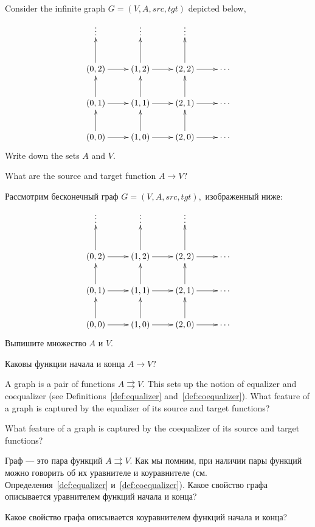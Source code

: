 \documentclass[../main/CT4S-EN-RU]{subfiles}
\begin{document}
\begin{exerciseENG}\label{exc:lattice}
Consider the infinite graph $G=(V,A,src,tgt)$ depicted below,
$$
\xymatrix{
\vdots&\vdots&\vdots\\
(0,2)\ar[r]\ar[u]&(1,2)\ar[r]\ar[u]&(2,2)\ar[r]\ar[u]&\cdots\\
(0,1)\ar[r]\ar[u]&(1,1)\ar[r]\ar[u]&(2,1)\ar[r]\ar[u]&\cdots\\
(0,0)\ar[r]\ar[u]&(1,0)\ar[r]\ar[u]&(2,0)\ar[r]\ar[u]&\cdots}
$$
\sexc Write down the sets $A$ and $V.$ 
\item What are the source and target function $A{→} V?$  
\endsexc
\end{exerciseENG}

\begin{exerciseRUS}\label{exc:lattice}
Рассмотрим бесконечный граф $G=(V,A,src,tgt),$ изображенный ниже:
$$\xymatrix{
    \vdots  &  \vdots  &  \vdots  \\
    (0,2) \ar[r] \ar[u]  &  (1,2) \ar[r] \ar[u]  &  (2,2) \ar[r] \ar[u]  &  \cdots\\
    (0,1) \ar[r] \ar[u]  &  (1,1) \ar[r] \ar[u]  &  (2,1) \ar[r] \ar[u]  &  \cdots\\
    (0,0) \ar[r] \ar[u]  &  (1,0) \ar[r] \ar[u]  &  (2,0) \ar[r] \ar[u]  &  \cdots
}$$
\sexc Выпишите множество $A$ и $V.$ 
\item Каковы функции начала и конца $A{→} V?$  
\endsexc
\end{exerciseRUS}

\begin{exerciseENG}\label{exc:(co)equalizer of graph}
A graph is a pair of functions $A{⇉} V.$ This sets up the notion of equalizer and coequalizer (see Definitions~\ref{def:equalizer} and~\ref{def:coequalizer}). 
\sexc What feature of a graph is captured by the equalizer of its source and target functions? 
\item What feature of a graph is captured by the coequalizer of its source and target functions?
\endsexc
\end{exerciseENG}

\begin{exerciseRUS}\label{exc:(co)equalizer of graph}
Граф — это пара функций $A{⇉} V.$ Как мы помним, при наличии пары функций можно говорить об их уравнителе и коуравнителе (см. Определения~\ref{def:equalizer} и~\ref{def:coequalizer}). 
\sexc Какое свойство графа описывается уравнителем функций начала и конца? 
\item Какое свойство графа описывается коуравнителем функций начала и конца? 
\endsexc
\end{exerciseRUS}
\end{document}
